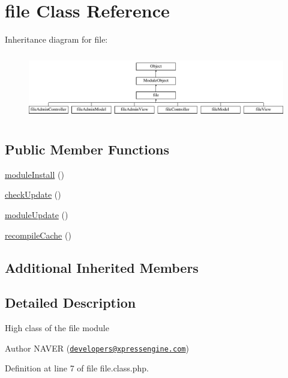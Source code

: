 \hypertarget{classfile}{\section{file Class Reference}
\label{classfile}
}
Inheritance diagram for file\-:\begin{figure}[H]
\begin{center}
\leavevmode
\includegraphics[height=2.916667cm]{classfile}
\end{center}
\end{figure}
\subsection*{Public Member Functions}
\begin{DoxyCompactItemize}
\item 
\hyperlink{classfile_a5e8c34a5d2187f2a332a88e112c90bdc}{module\-Install} ()
\item 
\hyperlink{classfile_ad9420bb93d958cdd9741a27137f9cf2a}{check\-Update} ()
\item 
\hyperlink{classfile_a13a5d2858426d421327f744555fec4fb}{module\-Update} ()
\item 
\hyperlink{classfile_abdd4624fd45f101cdf4009eeda3cc1ab}{recompile\-Cache} ()
\end{DoxyCompactItemize}
\subsection*{Additional Inherited Members}


\subsection{Detailed Description}
High class of the file module \begin{DoxyAuthor}{Author}
N\-A\-V\-E\-R (\href{mailto:developers@xpressengine.com}{\tt developers@xpressengine.\-com}) 
\end{DoxyAuthor}


Definition at line 7 of file file.\-class.\-php.



